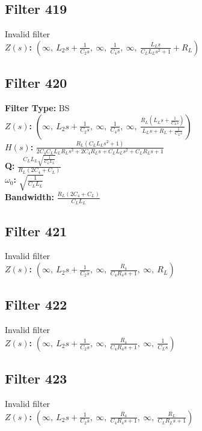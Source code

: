 \documentclass{article}
\begin{document}
\subsection*{Filter 419}
Invalid filter \\ 
\textbf{$Z(s)$:} $\left( \infty, \  L_{2} s + \frac{1}{C_{2} s}, \  \infty, \  \frac{1}{C_{4} s}, \  \infty, \  \frac{L_{L} s}{C_{L} L_{L} s^{2} + 1} + R_{L}\right)$ \\ 
\subsection*{Filter 420}
\textbf{Filter Type:} BS \\ 
\textbf{$Z(s)$:} $\left( \infty, \  L_{2} s + \frac{1}{C_{2} s}, \  \infty, \  \frac{1}{C_{4} s}, \  \infty, \  \frac{R_{L} \left(L_{L} s + \frac{1}{C_{L} s}\right)}{L_{L} s + R_{L} + \frac{1}{C_{L} s}}\right)$ \\ 
\textbf{$H(s)$:} $\frac{R_{L} \left(C_{L} L_{L} s^{2} + 1\right)}{2 C_{4} C_{L} L_{L} R_{L} s^{3} + 2 C_{4} R_{L} s + C_{L} L_{L} s^{2} + C_{L} R_{L} s + 1}$ \\ 
\textbf{Q:} $\frac{C_{L} L_{L} \sqrt{\frac{1}{C_{L} L_{L}}}}{R_{L} \left(2 C_{4} + C_{L}\right)}$ \\ 
\textbf{$\omega_0$:} $\sqrt{\frac{1}{C_{L} L_{L}}}$ \\ 
\textbf{Bandwidth:} $\frac{R_{L} \left(2 C_{4} + C_{L}\right)}{C_{L} L_{L}}$ \\ 
\subsection*{Filter 421}
Invalid filter \\ 
\textbf{$Z(s)$:} $\left( \infty, \  L_{2} s + \frac{1}{C_{2} s}, \  \infty, \  \frac{R_{4}}{C_{4} R_{4} s + 1}, \  \infty, \  R_{L}\right)$ \\ 
\subsection*{Filter 422}
Invalid filter \\ 
\textbf{$Z(s)$:} $\left( \infty, \  L_{2} s + \frac{1}{C_{2} s}, \  \infty, \  \frac{R_{4}}{C_{4} R_{4} s + 1}, \  \infty, \  \frac{1}{C_{L} s}\right)$ \\ 
\subsection*{Filter 423}
Invalid filter \\ 
\textbf{$Z(s)$:} $\left( \infty, \  L_{2} s + \frac{1}{C_{2} s}, \  \infty, \  \frac{R_{4}}{C_{4} R_{4} s + 1}, \  \infty, \  \frac{R_{L}}{C_{L} R_{L} s + 1}\right)$ \\ 
\end{document}
